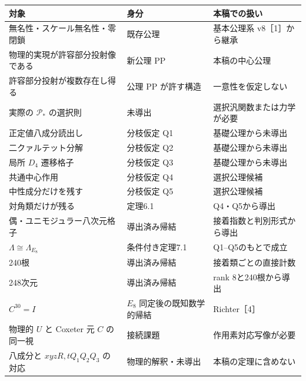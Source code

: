 \documentclass[
  a4paper,
  ja=minimal,
  xelatex,
  paragraph-mark={},
]{bxjsarticle}
\newcounter{none} %
\begin{document}
{\def\LTcaptype{none} %
\begin{longtable}[]{@{}
  >{\raggedright\arraybackslash}p{}
  >{\raggedright\arraybackslash}p{}
  >{\raggedright\arraybackslash}p{}@{}}
\toprule\noalign{}
\begin{minipage}[b]{\linewidth}\raggedright
対象
\end{minipage} & \begin{minipage}[b]{\linewidth}\raggedright
身分
\end{minipage} & \begin{minipage}[b]{\linewidth}\raggedright
本稿での扱い
\end{minipage} \\
\midrule\noalign{}
\endhead
\bottomrule\noalign{}
\endlastfoot
無名性・スケール無名性・零閉鎖 & 既存公理 & 基本公理系
v8［1］から継承 \\
物理的実現が許容部分投射像である & 新公理 PP & 本稿の中心公理 \\
許容部分投射が複数存在し得る & 公理 PP が許す構造 &
一意性を仮定しない \\
実際の \(\mathcal P_*\) の選択則 & 未導出 &
選択汎関数または力学が必要 \\
正定値八成分読出し & 分枝仮定 Q1 & 基礎公理から未導出 \\
二クァルテット分解 & 分枝仮定 Q2 & 基礎公理から未導出 \\
局所 \(D_4\) 遷移格子 & 分枝仮定 Q3 & 基礎公理から未導出 \\
共通中心作用 & 分枝仮定 Q4 & 選択公理候補 \\
中性成分だけを残す & 分枝仮定 Q5 & 選択公理候補 \\
対角類だけが残る & 定理6.1 & Q4・Q5から導出 \\
偶・ユニモジュラー八次元格子 & 導出済み帰結 &
接着指数と判別形式から導出 \\
\(\Lambda\cong\Lambda_{E_8}\) & 条件付き定理7.1 & Q1--Q5のもとで成立 \\
240根 & 導出済み帰結 & 接着類ごとの直接計数 \\
248次元 & 導出済み帰結 & rank 8と240根から導出 \\
\(C^{30}=I\) & \(E_8\) 同定後の既知数学的帰結 & Richter［4］ \\
物理的 \(U\) と Coxeter 元 \(C\) の同一視 & 接続課題 &
作用素対応写像が必要 \\
八成分と \(xyzR,tQ_1Q_2Q_3\) の対応 & 物理的解釈・未導出 &
本稿の定理に含めない \\
\end{longtable}
}
\end{document}
